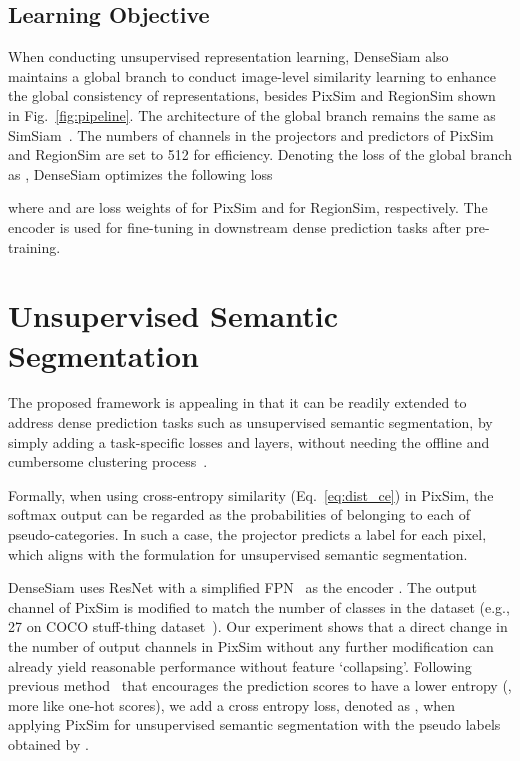 \documentclass[runningheads]{llncs}
\begin{document}
\subsection{Learning Objective}\label{subsec:loss}

When conducting unsupervised representation learning,
DenseSiam also maintains a global branch to conduct image-level similarity learning to enhance the global consistency of representations, besides PixSim and RegionSim shown in Fig.~\ref{fig:pipeline}.
The architecture of the global branch remains the same as SimSiam~\cite{simsiam}.
The numbers of channels in the projectors and predictors of PixSim and RegionSim are set to 512 for efficiency.
Denoting the loss of the global branch as , DenseSiam optimizes the following loss

where  and  are loss weights of  for PixSim and  for RegionSim, respectively.
The encoder  is used for fine-tuning in downstream dense prediction tasks after pre-training.



\section{Unsupervised Semantic Segmentation}
\label{sec:uss}


The proposed framework is appealing in that it can be readily extended to address dense prediction tasks such as unsupervised semantic segmentation, by simply adding a task-specific losses and layers, without needing the offline and cumbersome clustering process~\cite{autoregressive, iic, picie}.

Formally, when using cross-entropy similarity (Eq.~\ref{eq:dist_ce}) in PixSim,
the softmax output  can be regarded as the probabilities of belonging to each of  pseudo-categories.
In such a case, the projector  predicts a label for each pixel, which aligns with the formulation for unsupervised semantic segmentation.

DenseSiam uses ResNet with a simplified FPN~\cite{fpn, picie} as the encoder .
The output channel  of PixSim is modified to match the number of classes in the dataset (e.g., 27 on COCO stuff-thing dataset~\cite{coco, picie}).
Our experiment shows that a direct change in the number of output channels in PixSim without any further modification can already yield reasonable performance without feature `collapsing'.
Following previous method~\cite{picie} that encourages the prediction scores to have a lower entropy (\ie, more like one-hot scores),
we add a cross entropy loss, denoted as , when applying PixSim for unsupervised semantic segmentation with the pseudo labels obtained by .
\end{document}
